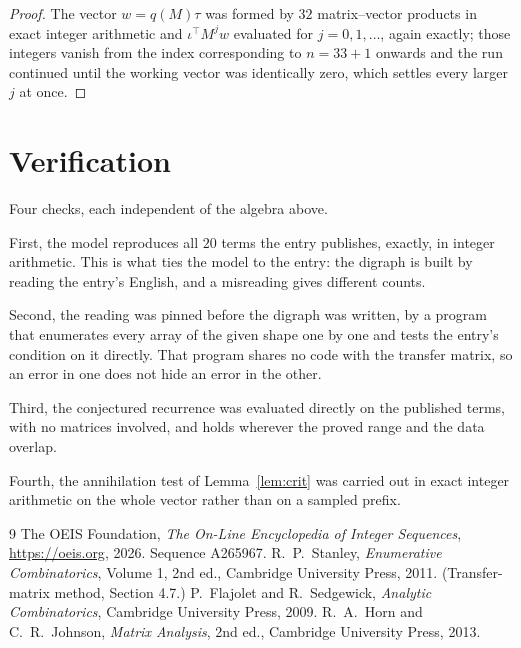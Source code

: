 \documentclass[11pt,a4paper]{article}
\theoremstyle{plain}
\theoremstyle{definition}
\begin{document}
\begin{proof}
The vector $w=q(M)\tau$ was formed by $32$ matrix--vector products in exact integer
arithmetic and $\iota^{\!\top}M^{j}w$ evaluated for $j=0,1,\dots$, again exactly; those
integers vanish from the index corresponding to $n=33+1$ onwards and the run continued
until the working vector was identically zero, which settles every larger $j$ at once.
\end{proof}

\section{Verification}

Four checks, each independent of the algebra above.

First, the model reproduces all $20$ terms the entry publishes, exactly, in integer
arithmetic. This is what ties the model to the entry: the digraph is built by reading the
entry's English, and a misreading gives different counts.

Second, the reading was pinned before the digraph was written, by a program that enumerates
every array of the given shape one by one and tests the entry's condition on it directly. That program shares no code with the transfer matrix, so an error in one does not
hide an error in the other.

Third, the conjectured recurrence was evaluated directly on the published terms, with no
matrices involved, and holds wherever the proved range and the data overlap.

Fourth, the annihilation test of Lemma~\ref{lem:crit} was carried out in exact integer
arithmetic on the whole vector rather than on a sampled prefix.

\begin{thebibliography}{9}
 The OEIS Foundation, \emph{The On-Line Encyclopedia of Integer
Sequences}, \url{https://oeis.org}, 2026. Sequence A265967.
 R.~P.~Stanley, \emph{Enumerative Combinatorics}, Volume 1, 2nd ed.,
Cambridge University Press, 2011. (Transfer-matrix method, Section 4.7.)
 P.~Flajolet and R.~Sedgewick, \emph{Analytic Combinatorics}, Cambridge
University Press, 2009.
 R.~A.~Horn and C.~R.~Johnson, \emph{Matrix Analysis}, 2nd ed., Cambridge
University Press, 2013.
\end{thebibliography}
\end{document}
